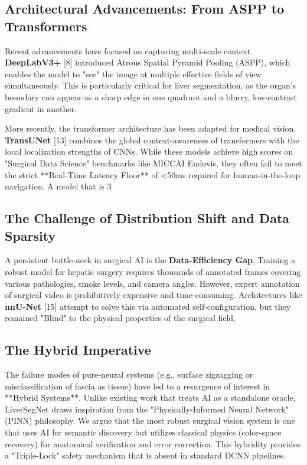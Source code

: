 \documentclass[conference]{IEEEtran}
\begin{document}
\subsection{Architectural Advancements: From ASPP to Transformers}
Recent advancements have focused on capturing multi-scale context. \textbf{DeepLabV3+} [8] introduced Atrous Spatial Pyramid Pooling (ASPP), which enables the model to "see" the image at multiple effective fields of view simultaneously. This is particularly critical for liver segmentation, as the organ's boundary can appear as a sharp edge in one quadrant and a blurry, low-contrast gradient in another. 

More recently, the transformer architecture has been adapted for medical vision. \textbf{TransUNet} [13] combines the global context-awareness of transformers with the local localization strengths of CNNs. While these models achieve high scores on "Surgical Data Science" benchmarks like MICCAI Endovis, they often fail to meet the strict **Real-Time Latency Floor** of <50ms required for human-in-the-loop navigation. A model that is 3%

\subsection{The Challenge of Distribution Shift and Data Sparsity}
A persistent bottle-neck in surgical AI is the \textbf{Data-Efficiency Gap}. Training a robust model for hepatic surgery requires thousands of annotated frames covering various pathologies, smoke levels, and camera angles. However, expert annotation of surgical video is prohibitively expensive and time-consuming. Architectures like \textbf{nnU-Net} [15] attempt to solve this via automated self-configuration, but they remained "Blind" to the physical properties of the surgical field.

\subsection{The Hybrid Imperative}
The failure modes of pure-neural systems (e.g., surface zigzagging or misclassification of fascia as tissue) have led to a resurgence of interest in **Hybrid Systems**. Unlike existing work that treats AI as a standalone oracle, LiverSegNet draws inspiration from the "Physically-Informed Neural Network" (PINN) philosophy. We argue that the most robust surgical vision system is one that uses AI for semantic discovery but utilizes classical physics (color-space recovery) for anatomical verification and error correction. This hybridity provides a "Triple-Lock" safety mechanism that is absent in standard DCNN pipelines.
\end{document}
